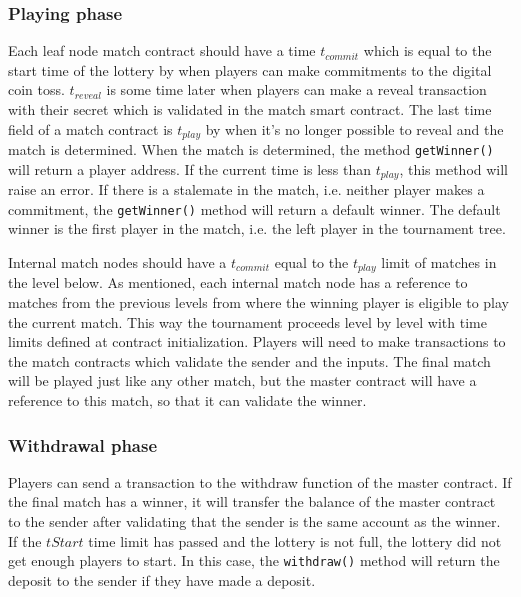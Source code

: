 \subsubsection{Playing phase}
Each leaf node match contract should have a time $t_{commit}$ which is equal to the start time of the lottery by when players can make commitments to the digital coin toss. $t_{reveal}$ is some time later when players can make a reveal transaction with their secret which is validated in the match smart contract. The last time field of a match contract is $t_{play}$ by when it's no longer possible to reveal and the match is determined. When the match is determined, the method \texttt{getWinner()} will return a player address. If the current time is less than $t_{play}$, this method will raise an error. If there is a stalemate in the match, i.e. neither player makes a commitment, the \texttt{getWinner()} method will return a default winner. The default winner is the first player in the match, i.e. the left player in the tournament tree. 

Internal match nodes should have a $t_{commit}$ equal to the $t_{play}$ limit of matches in the level below. As mentioned, each internal match node has a reference to matches from the previous levels from where the winning player is eligible to play the current match. This way the tournament proceeds level by level with time limits defined at contract initialization. Players will need to make transactions to the match contracts which validate the sender and the inputs. The final match will be played just like any other match, but the master contract will have a reference to this match, so that it can validate the winner.

\subsubsection{Withdrawal phase}
Players can send a transaction to the withdraw function of the master contract. If the final match has a winner, it will transfer the balance of the master contract to the sender after validating that the sender is the same account as the winner. If the $tStart$ time limit has passed and the lottery is not full, the lottery did not get enough players to start. In this case, the \texttt{withdraw()} method will return the deposit to the sender if they have made a deposit.
